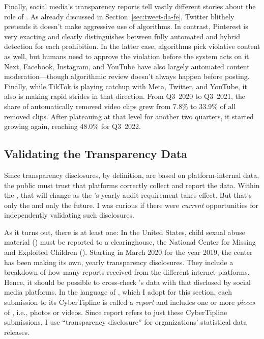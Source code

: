 Finally, social media's transparency reports tell vastly different stories about
the role of . As already discussed in Section~\ref{sec:tweet-da-fe}, Twitter
blithely pretends it doesn't make aggressive use of algorithms. In contrast,
Pinterest is very exacting and clearly distinguishes between fully automated and
hybrid detection for each prohibition. In the latter case, algorithms pick
violative content as well, but humans need to approve the violation before the
system acts on it. Next, Facebook, Instagram, and YouTube have also largely
automated content moderation---though algorithmic review doesn't always happen
before posting. Finally, while TikTok is playing catchup with Meta, Twitter, and
YouTube, it also is making rapid strides in that direction. From Q3~2020 to
Q3~2021, the share of automatically removed video clips grew from 7.8\% to
33.9\% of all removed clips. After plateauing at that level for another two
quarters, it started growing again, reaching 48.0\% for Q3~2022.


\subsection{Validating the Transparency Data}
\label{sec:census-validation}

Since transparency disclosures, by definition, are based on platform-internal
data, the public must trust that platforms correctly collect and report the
data. Within the , that will change as the 's yearly audit requirement
takes effect. But that's only the  and only the future. I was curious if
there were \emph{current} opportunities for independently validating such
disclosures.

As it turns out, there is at least one: In the United States, child sexual abuse
material () must be reported to a clearinghouse, the National Center for
Missing and Exploited Children (). Starting in March 2020 for the year
2019, the center has been making its own, yearly transparency disclosures. They
include a breakdown of how many reports  received from the different
internet platforms. Hence, it should be possible to cross-check 's data
with that disclosed by social media platforms. In the language of , which
I adopt for this section, each submission to its CyberTipline is called a
\emph{report} and includes one or more \emph{pieces} of , i.e., photos or
videos. Since report refers to just these CyberTipline submissions, I use
``transparency disclosure'' for organizations' statistical data releases.

